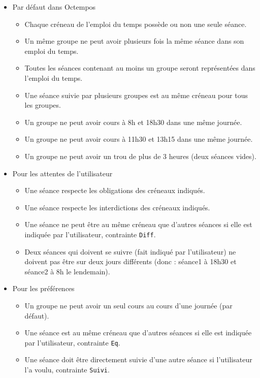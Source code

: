 \documentclass[12pt,a4paper]{article}
\begin{document}
\begin{itemize}[label=]
    \item Par défaut dans Octempos
    \begin{itemize}[label=\textbullet]
        \item Chaque créneau de l'emploi du temps possède ou non une seule séance.
        \item Un même groupe ne peut avoir plusieurs fois la même séance dans son emploi du temps.
        \item Toutes les séances contenant au moins un groupe seront représentées dans l'emploi du temps.
        \item Une séance suivie par plusieurs groupes est au même créneau pour tous les groupes.
        \item Un groupe ne peut avoir cours à 8h et 18h30 dans une même journée.
        \item Un groupe ne peut avoir cours à 11h30 et 13h15 dans une même journée.
        \item Un groupe ne peut avoir un trou de plus de 3 heures (deux séances vides).
    \end{itemize}
    \item Pour les attentes de l'utilisateur
    \begin{itemize}[label=\textbullet]
        \item Une séance respecte les obligations des créneaux indiqués.
        \item Une séance respecte les interdictions des créneaux indiqués.
        \item Une séance ne peut être au même créneau que d'autres séances si elle est indiquée par l'utilisateur, contrainte \texttt{Diff}.
        \item Deux séances qui doivent se suivre (fait indiqué par l'utilisateur) ne doivent pas être sur deux jours différents (donc : séance1 à 18h30 et séance2 à 8h le lendemain).
    \end{itemize}
    \item Pour les préférences
    \begin{itemize}[label=\textbullet]
        \item Un groupe ne peut avoir un seul cours au cours d'une journée (par défaut).
        \item Une séance est au même créneau que d'autres séances si elle est indiquée par l'utilisateur, contrainte \texttt{Eq}.
        \item Une séance doit être directement suivie d'une autre séance si l'utilisateur l'a voulu, contrainte \texttt{Suivi}.
    \end{itemize}
\end{itemize}
\end{document}
